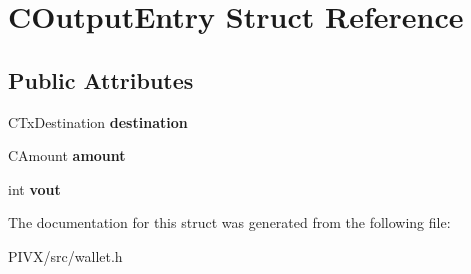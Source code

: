 \hypertarget{struct_c_output_entry}{}\section{C\+Output\+Entry Struct Reference}
\label{struct_c_output_entry}
\subsection*{Public Attributes}
\begin{DoxyCompactItemize}
\item 
\mbox{\label{struct_c_output_entry_af5961d67591eb98aefe95bf60f2a13e6}} 
C\+Tx\+Destination {\bfseries destination}
\item 
\mbox{\label{struct_c_output_entry_acb32c29f06f4b66d1de6bcec47f8f704}} 
C\+Amount {\bfseries amount}
\item 
\mbox{\label{struct_c_output_entry_af2c29f7df8dc2a44513b906c16f8b4ea}} 
int {\bfseries vout}
\end{DoxyCompactItemize}


The documentation for this struct was generated from the following file\+:\begin{DoxyCompactItemize}
\item 
P\+I\+V\+X/src/wallet.\+h\end{DoxyCompactItemize}
